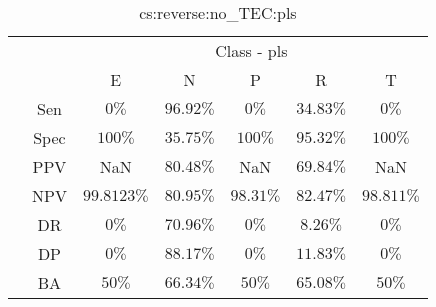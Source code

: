 \begin{table}[!ht]
	\centering
	\begin{tabular}{|c|c|c|c|c|c|c|}
		\cline{3-7}
		\multicolumn{2}{c|}{} & \multicolumn{5}{c|}{Class - pls} \\ \cline{3-7}
		\multicolumn{2}{c|}{} & E & N & P & R & T \\ \hline
		\multirow{7}{*}{\rotatebox{90}{Statistics}} & Sen & $0\%$ & $96.92\%$ & $0\%$ & $34.83\%$ & $0\%$ \\ \cline{2-7}
		 & Spec & $100\%$ & $35.75\%$ & $100\%$ & $95.32\%$ & $100\%$ \\ \cline{2-7}
		 & PPV & NaN & $80.48\%$ & NaN & $69.84\%$ & NaN \\ \cline{2-7}
		 & NPV & $99.8123\%$ & $80.95\%$ & $98.31\%$ & $82.47\%$ & $98.811\%$ \\ \cline{2-7}
		 & DR & $0\%$ & $70.96\%$ & $0\%$ & $8.26\%$ & $0\%$ \\ \cline{2-7}
		 & DP & $0\%$ & $88.17\%$ & $0\%$ & $11.83\%$ & $0\%$ \\ \cline{2-7}
		 & BA & $50\%$ & $66.34\%$ & $50\%$ & $65.08\%$ & $50\%$ \\ \hline
	\end{tabular}
	\caption{cs:reverse:no_TEC:pls}
	\label{tab:cs:reverse:no_TEC:pls}
\end{table}
